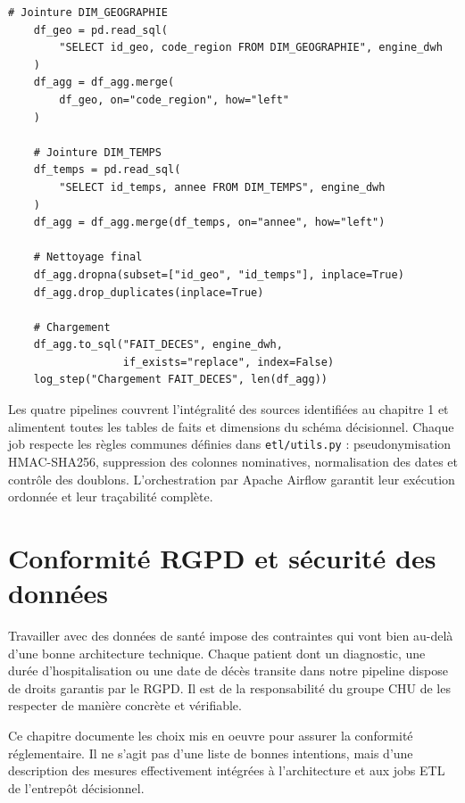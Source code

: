 \documentclass[12pt, a4paper]{report}
\begin{document}
\begin{itemize}[label=\textcolor{chuBlue}{\textbullet}]
\begin{lstlisting}[style=python, caption={Job 4 -- traitement et chargement des registres de décès}, label={lst:job4}]
    # Jointure DIM_GEOGRAPHIE
    df_geo = pd.read_sql(
        "SELECT id_geo, code_region FROM DIM_GEOGRAPHIE", engine_dwh
    )
    df_agg = df_agg.merge(
        df_geo, on="code_region", how="left"
    )

    # Jointure DIM_TEMPS
    df_temps = pd.read_sql(
        "SELECT id_temps, annee FROM DIM_TEMPS", engine_dwh
    )
    df_agg = df_agg.merge(df_temps, on="annee", how="left")

    # Nettoyage final
    df_agg.dropna(subset=["id_geo", "id_temps"], inplace=True)
    df_agg.drop_duplicates(inplace=True)

    # Chargement
    df_agg.to_sql("FAIT_DECES", engine_dwh,
                  if_exists="replace", index=False)
    log_step("Chargement FAIT_DECES", len(df_agg))
\end{lstlisting}

\begin{infobox}
Les quatre pipelines couvrent l'intégralité des sources identifiées au chapitre 1 et alimentent toutes les tables de faits et dimensions du schéma décisionnel. Chaque job respecte les règles communes définies dans \texttt{etl/utils.py} : pseudonymisation HMAC-SHA256, suppression des colonnes nominatives, normalisation des dates et contrôle des doublons. L'orchestration par Apache Airflow garantit leur exécution ordonnée et leur traçabilité complète.
\end{infobox}



\chapter{Conformité RGPD et sécurité des données}

Travailler avec des données de santé impose des contraintes qui vont bien au-delà d'une bonne architecture technique. Chaque patient dont un diagnostic, une durée d'hospitalisation ou une date de décès transite dans notre pipeline dispose de droits garantis par le RGPD. Il est de la responsabilité du groupe CHU de les respecter de manière concrète et vérifiable.

Ce chapitre documente les choix mis en oeuvre pour assurer la conformité réglementaire. Il ne s'agit pas d'une liste de bonnes intentions, mais d'une description des mesures effectivement intégrées à l'architecture et aux jobs ETL de l'entrepôt décisionnel.


\end{itemize}
\end{document}
